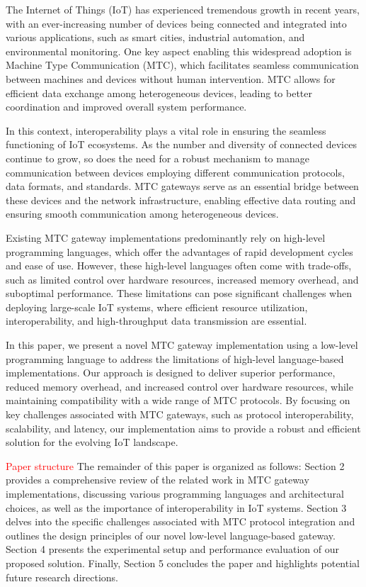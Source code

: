 \documentclass[a4paper,fleqn]{cas-dc}
\begin{document}
The Internet of Things (IoT) has experienced tremendous growth in recent years, with an ever-increasing number of devices being connected and integrated into various applications, such as smart cities, industrial automation, and environmental monitoring. One key aspect enabling this widespread adoption is Machine Type Communication (MTC), which facilitates seamless communication between machines and devices without human intervention. MTC allows for efficient data exchange among heterogeneous devices, leading to better coordination and improved overall system performance.

In this context, interoperability plays a vital role in ensuring the seamless functioning of IoT ecosystems. As the number and diversity of connected devices continue to grow, so does the need for a robust mechanism to manage communication between devices employing different communication protocols, data formats, and standards. MTC gateways serve as an essential bridge between these devices and the network infrastructure, enabling effective data routing and ensuring smooth communication among heterogeneous devices.

Existing MTC gateway implementations predominantly rely on high-level programming languages, which offer the advantages of rapid development cycles and ease of use. However, these high-level languages often come with trade-offs, such as limited control over hardware resources, increased memory overhead, and suboptimal performance. These limitations can pose significant challenges when deploying large-scale IoT systems, where efficient resource utilization, interoperability, and high-throughput data transmission are essential.

In this paper, we present a novel MTC gateway implementation using a low-level programming language to address the limitations of high-level language-based implementations. Our approach is designed to deliver superior performance, reduced memory overhead, and increased control over hardware resources, while maintaining compatibility with a wide range of MTC protocols. By focusing on key challenges associated with MTC gateways, such as protocol interoperability, scalability, and latency, our implementation aims to provide a robust and efficient solution for the evolving IoT landscape.

\textcolor{red}{Paper structure} The remainder of this paper is organized as follows: Section 2 provides a comprehensive review of the related work in MTC gateway implementations, discussing various programming languages and architectural choices, as well as the importance of interoperability in IoT systems. Section 3 delves into the specific challenges associated with MTC protocol integration and outlines the design principles of our novel low-level language-based gateway. Section 4 presents the experimental setup and performance evaluation of our proposed solution. Finally, Section 5 concludes the paper and highlights potential future research directions.
\end{document}
